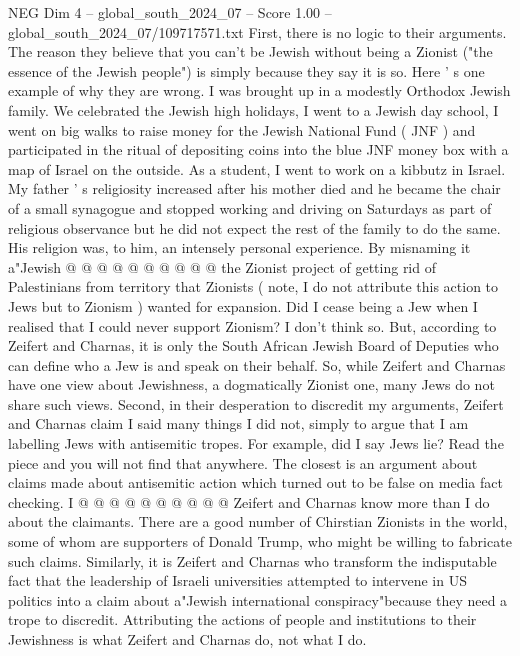 \begin{textsample}{NEG Dim 4 – global\_south\_2024\_07 – Score 1.00 – global\_south\_2024\_07/109717571.txt}  \label{ex:f4_neg_344}
First, there is no logic to their arguments.
The reason they believe that you can't be Jewish without being a Zionist ("the essence of the Jewish people") is simply because they say it is so.
Here ' s one example of why they are wrong.
I was brought up in a modestly Orthodox Jewish family.
We celebrated the Jewish high holidays, I went to a Jewish day school, I went on big walks to raise money for the Jewish National Fund ( JNF ) and participated in the ritual of depositing coins into the blue JNF money box with a map of Israel on the outside.
As a student, I went to work on a kibbutz in Israel.
My father ' s religiosity increased after his mother died and he became the chair of a small synagogue and stopped working and driving on Saturdays as part of religious observance but he did not expect the rest of the family to do the same.
His religion was, to him, an intensely personal experience.
By misnaming it a"Jewish @ @ @ @ @ @ @ @ @ @ the Zionist project of getting rid of Palestinians from territory that Zionists ( note, I do not attribute this action to Jews but to Zionism ) wanted for expansion.
Did I cease being a Jew when I realised that I could never support Zionism?
I don't think so.
But, according to Zeifert and Charnas, it is only the South African Jewish Board of Deputies who can define who a Jew is and speak on their behalf.
So, while Zeifert and Charnas have one view about Jewishness, a dogmatically Zionist one, many Jews do not share such views.
Second, in their desperation to discredit my arguments, Zeifert and Charnas claim I said many things I did not, simply to argue that I am labelling Jews with antisemitic tropes.
For example, did I say Jews lie?
Read the piece and you will not find that anywhere.
The closest is an argument about claims made about antisemitic action which turned out to be false on media fact checking.
I @ @ @ @ @ @ @ @ @ @ Zeifert and Charnas know more than I do about the claimants.
There are a good number of Chirstian Zionists in the world, some of whom are supporters of Donald Trump, who might be willing to fabricate such claims.
Similarly, it is Zeifert and Charnas who transform the indisputable fact that the leadership of Israeli universities attempted to intervene in US politics into a claim about a"Jewish international conspiracy"because they need a trope to discredit.
Attributing the actions of people and institutions to their Jewishness is what Zeifert and Charnas do, not what I do.

\end{textsample}
